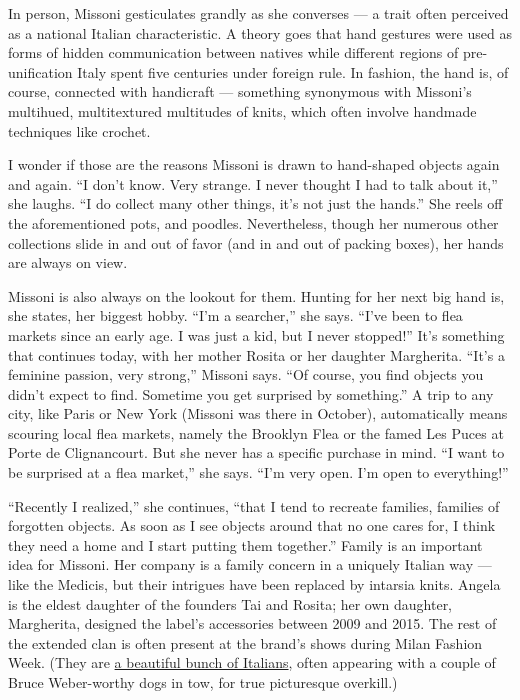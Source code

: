 In person, Missoni gesticulates grandly as she converses --- a trait
often perceived as a national Italian characteristic. A theory goes that
hand gestures were used as forms of hidden communication between natives
while different regions of pre-unification Italy spent five centuries
under foreign rule. In fashion, the hand is, of course, connected with
handicraft --- something synonymous with Missoni's multihued,
multitextured multitudes of knits, which often involve handmade
techniques like crochet.

I wonder if those are the reasons Missoni is drawn to hand-shaped
objects again and again. ``I don't know. Very strange. I never thought I
had to talk about it,'' she laughs. ``I do collect many other things,
it's not just the hands.'' She reels off the aforementioned pots, and
poodles. Nevertheless, though her numerous other collections slide in
and out of favor (and in and out of packing boxes), her hands are always
on view.

Missoni is also always on the lookout for them. Hunting for her next big
hand is, she states, her biggest hobby. ``I'm a searcher,'' she says.
``I've been to flea markets since an early age. I was just a kid, but I
never stopped!'' It's something that continues today, with her mother
Rosita or her daughter Margherita. ``It's a feminine passion, very
strong,'' Missoni says. ``Of course, you find objects you didn't expect
to find. Sometime you get surprised by something.'' A trip to any city,
like Paris or New York (Missoni was there in October), automatically
means scouring local flea markets, namely the Brooklyn Flea or the famed
Les Puces at Porte de Clignancourt. But she never has a specific
purchase in mind. ``I want to be surprised at a flea market,'' she says.
``I'm very open. I'm open to everything!''

``Recently I realized,'' she continues, ``that I tend to recreate
families, families of forgotten objects. As soon as I see objects around
that no one cares for, I think they need a home and I start putting them
together.'' Family is an important idea for Missoni. Her company is a
family concern in a uniquely Italian way --- like the Medicis, but their
intrigues have been replaced by intarsia knits. Angela is the eldest
daughter of the founders Tai and Rosita; her own daughter, Margherita,
designed the label's accessories between 2009 and 2015. The rest of the
extended clan is often present at the brand's shows during Milan Fashion
Week. (They are
\href{https://www.nytimes.com/2014/10/17/t-magazine/missoni-cutest-family-ever.html}{a
beautiful bunch of Italians}, often appearing with a couple of Bruce
Weber-worthy dogs in tow, for true picturesque overkill.)

